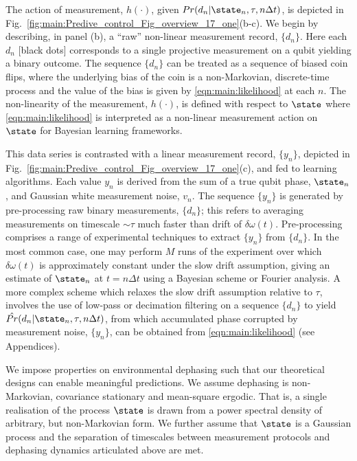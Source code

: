 The action of measurement, $h(\cdot)$, given $Pr(d_n | \state_n, \tau, n \Delta t)$, is depicted in Fig.~\ref{fig:main:Predive_control_Fig_overview_17_one}(b-c).  We begin by describing, in panel (b), a ``raw'' non-linear measurement record, $\{ d_n\}$.  Here each $d_n$ [black dots] corresponds to a single projective measurement on a qubit yielding a binary outcome. The sequence $\{ d_n\}$ can be treated as a sequence of biased coin flips, where the underlying bias of the coin is a non-Markovian, discrete-time process and the value of the bias is given by \cref{eqn:main:likelihood} at each $n$. The non-linearity of the measurement, $h(\cdot)$, is defined with respect to $\state$ where \cref{eqn:main:likelihood} is interpreted as a non-linear measurement action on $\state$ for Bayesian learning frameworks.

This data series is contrasted with a linear measurement record, $\{ y_n\}$, depicted in Fig.~\ref{fig:main:Predive_control_Fig_overview_17_one}(c), and fed to learning algorithms.  Each value $y_n$ is derived from the sum of a true qubit phase, $\state_n$, and Gaussian white measurement noise, $v_n$.  The sequence $\{ y_n\}$ is generated by pre-processing raw binary measurements, $\{ d_n\}$; this refers to averaging measurements on timescale $\sim\tau$ much faster than drift of $\delta \omega (t)$. Pre-processing comprises a range of experimental techniques to extract $\{ y_n\}$ from $\{ d_n\}$. In the most common case, one may perform $M$ runs of the experiment over which $\delta \omega (t)$ is approximately constant under the slow drift assumption, giving an estimate of  $\state_n$ at $t = n \Delta t $ using a Bayesian scheme or Fourier analysis. A more complex scheme which relaxes the slow drift assumption relative to $\tau$, involves the use of low-pass or decimation filtering on a sequence $\{ d_n\}$  to yield $\hat{Pr}(d_n | \state_n, \tau, n\Delta t)$, from which accumulated phase corrupted by measurement noise, $\{ y_n\}$, can be obtained from \cref{eqn:main:likelihood} (see Appendices). 

We impose properties on environmental dephasing such that our theoretical designs can enable meaningful predictions. We assume dephasing is non-Markovian, covariance stationary and mean-square ergodic.  That is, a single realisation of the process $\state$ is drawn from a power spectral density of arbitrary, but non-Markovian form. We further assume that $\state$ is a Gaussian process and the separation of timescales between measurement protocols and dephasing dynamics articulated above are met.

